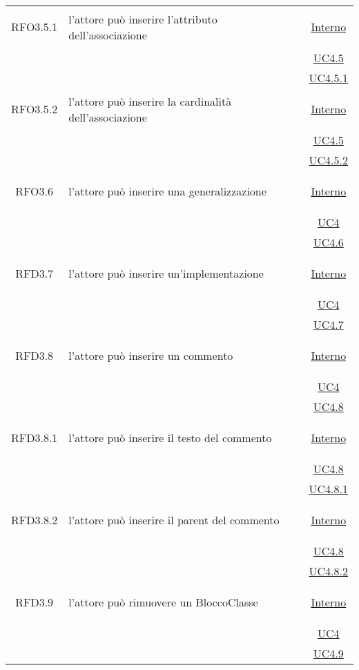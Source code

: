 \begin{longtable}{|c|>{\centering}m{7cm}|c|}
\hypertarget{RFO3.5.1}{RFO3.5.1} & l'attore può inserire l'attributo dell'associazione &  \hyperlink{Interno}{Interno}\\
& &\hyperref[UC4.5]{UC4.5}\\
& &\hyperref[UC4.5.1]{UC4.5.1}\\ \hline

\hypertarget{RFO3.5.2}{RFO3.5.2} & l'attore può inserire la cardinalità dell'associazione &  \hyperlink{Interno}{Interno}\\
& &\hyperref[UC4.5]{UC4.5}\\
& &\hyperref[UC4.5.2]{UC4.5.2}\\ \hline

\hypertarget{RFO3.6}{RFO3.6} & l'attore può inserire una generalizzazione &  \hyperlink{Interno}{Interno}\\
& &\hyperref[UC4]{UC4}\\
& &\hyperref[UC4.6]{UC4.6}\\ \hline

\hypertarget{RFD3.7}{RFD3.7} & l'attore può inserire un'implementazione &  \hyperlink{Interno}{Interno}\\
& &\hyperref[UC4]{UC4}\\
& &\hyperref[UC4.7]{UC4.7}\\ \hline

\hypertarget{RFD3.8}{RFD3.8} & l'attore può inserire un commento &  \hyperlink{Interno}{Interno}\\
& &\hyperref[UC4]{UC4}\\
& &\hyperref[UC4.8]{UC4.8}\\ \hline

\hypertarget{RFD3.8.1}{RFD3.8.1} & l'attore può inserire il testo del commento &  \hyperlink{Interno}{Interno}\\
& &\hyperref[UC4.8]{UC4.8}\\
& &\hyperref[UC4.8.1]{UC4.8.1}\\ \hline

\hypertarget{RFD3.8.2}{RFD3.8.2} & l'attore può inserire il parent del commento &  \hyperlink{Interno}{Interno}\\
& &\hyperref[UC4.8]{UC4.8}\\
& &\hyperref[UC4.8.2]{UC4.8.2}\\ \hline

\hypertarget{RFD3.9}{RFD3.9} & l'attore può rimuovere un BloccoClasse &  \hyperlink{Interno}{Interno}\\
& &\hyperref[UC4]{UC4}\\
& &\hyperref[UC4.9]{UC4.9}\\ \hline


\end{longtable}

